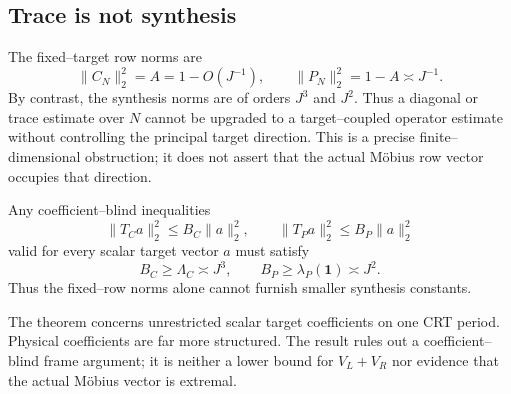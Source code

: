 \subsection{Trace is not synthesis}

The fixed--target row norms are
\begin{equation}
 \|C_N\|_2^2=A=1-O(J^{-1}),
 \qquad
 \|P_N\|_2^2=1-A\asymp J^{-1}.
 \label{eq:tpc38-row-norms-versus-synthesis}
\end{equation}
By contrast, the synthesis norms are of orders \(J^3\) and \(J^2\).
Thus a diagonal or trace estimate over \(N\) cannot be upgraded to a
target--coupled operator estimate without controlling the principal target
direction.  This is a precise finite--dimensional obstruction; it does not
assert that the actual M\"obius row vector occupies that direction.

\begin{corollary}
\label{cor:tpc38-target-Bessel-obstruction}
Any coefficient--blind inequalities
\begin{equation}
 \|T_Ca\|_2^2\le B_C\|a\|_2^2,
 \qquad
 \|T_Pa\|_2^2\le B_P\|a\|_2^2
 \label{eq:tpc38-coefficient-blind-Bessel-bounds}
\end{equation}
valid for every scalar target vector \(a\) must satisfy
\begin{equation}
 B_C\ge\Lambda_C\asymp J^3,
 \qquad
 B_P\ge\lambda_P(\mathbf1)\asymp J^2.
 \label{eq:tpc38-coefficient-blind-lower-bounds}
\end{equation}
Thus the fixed--row norms alone cannot furnish smaller synthesis constants.
\end{corollary}

\begin{remark}[Scope]
The theorem concerns unrestricted scalar target coefficients on one CRT
period.  Physical coefficients are far more structured.  The result rules
out a coefficient--blind frame argument; it is neither a lower bound for
\(V_L+V_R\) nor evidence that the actual M\"obius vector is extremal.
\end{remark}
